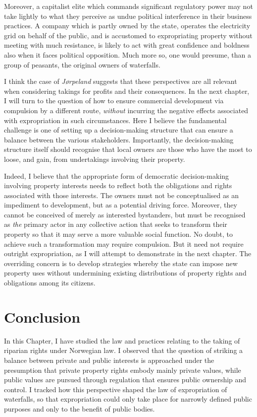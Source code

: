 {{Moreover, a capitalist elite which commands significant regulatory power may not take lightly to what they perceive as undue political interference in their business practices. A company which is partly owned by the state, operates the electricity grid on behalf of the public, and is accustomed to expropriating property without meeting with much resistance, is likely to act with great confidence and boldness also when it faces political opposition. Much more so, one would presume, than a group of peasants, the original owners of waterfalls.

I think the case of \emph{Jørpeland} suggests that these perspectives are all relevant when considering takings for profits and their consequences. In the next chapter, I will turn to the question of how to ensure commercial development via compulsion by a different route, {\it without} incurring the negative effects associated with expropriation in such circumstances. Here I believe the fundamental challenge is one of setting up a decision-making structure that can ensure a balance between the various stakeholders. Importantly, the decision-making structure itself should recognise that local owners are those who have the most to loose, and gain, from undertakings involving their property. 

Indeed, I believe that the appropriate form of democratic decision-making involving property interests needs to reflect both the obligations and rights associated with those interests. The owners must not be conceptualised as an impediment to development, but as a potential driving force. Moreover, they cannot be conceived of merely as interested bystanders, but must be recognised as {\it the} primary actor in any collective action that seeks to transform their property so that it may serve a more valuable social function. No doubt, to achieve such a transformation may require compulsion. But it need not require outright expropriation, as I will attempt to demonstrate in the next chapter. The overriding concern is to develop strategies whereby the state can impose new property uses without undermining existing distributions of property rights and obligations among its citizens.
}
}
\section{Conclusion}\label{conc}

In this Chapter, I have studied the law and practices relating to the taking of riparian rights under Norwegian law. I observed that the question of striking a balance between private and public interests is approached under the presumption that private property rights embody mainly private values, while public values are pursued through regulation that ensures public ownership and control. I tracked how this perspective shaped the law of expropriation of waterfalls, so that expropriation could only take place for narrowly defined public purposes and only to the benefit of public bodies.

